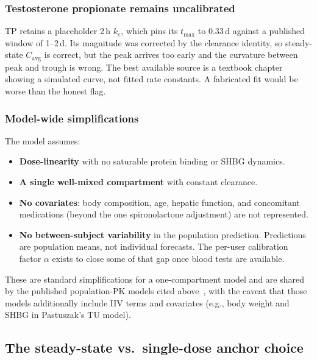 \documentclass[11pt,a4paper]{article}
\begin{document}
\subsubsection{Testosterone propionate remains uncalibrated}
\label{sec:tp_limitation}

TP retains a placeholder 2\,h $k_e$, which pins its $t_{\max}$ to 0.33\,d
against a published window of 1--2\,d. Its magnitude was corrected by
the clearance identity, so steady-state $C_{\mathrm{avg}}$ is correct,
but the peak arrives too early and the curvature between peak and trough
is wrong. The best available source is a textbook chapter~\cite{behre2004}
showing a simulated curve, not fitted rate constants. A fabricated fit
would be worse than the honest flag.

\subsubsection{Model-wide simplifications}
\label{sec:simplifications}

The model assumes:
\begin{itemize}[nosep,leftmargin=1.4em]
\item \textbf{Dose-linearity} with no saturable protein binding or SHBG
  dynamics.
\item \textbf{A single well-mixed compartment} with constant clearance.
\item \textbf{No covariates}: body composition, age, hepatic function,
  and concomitant medications (beyond the one spironolactone adjustment)
  are not represented.
\item \textbf{No between-subject variability} in the population
  prediction. Predictions are population means, not individual
  forecasts. The per-user calibration factor $\alpha$ exists to close
  some of that gap once blood tests are available.
\end{itemize}

These are standard simplifications for a one-compartment model and are
shared by the published population-PK models cited
above~\cite{bi2018,ichihara2020,pastuszak2021}, with the caveat that
those models additionally include IIV terms and covariates (e.g., body
weight and SHBG in Pastuszak's TU model).

\subsection{The steady-state vs.\ single-dose anchor choice}
\label{sec:anchor_choice}
\end{document}
